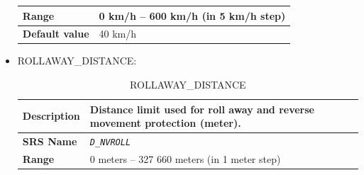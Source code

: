 \begin{itemize}
\begin{longtable}{|l|l|}
				\hline

					\begin{minipage}[t]{0.22\linewidth} \textbf{Range}	\end{minipage}
				&	\begin{minipage}[t]{0.78\linewidth} 0 km/h – 600 km/h (in 5 km/h step) \end{minipage} \\

				\hline

					\begin{minipage}[t]{0.22\linewidth} \textbf{Default value}	\end{minipage}
				&	\begin{minipage}[t]{0.78\linewidth} 40 km/h \end{minipage} \\

				\hline

			\end{longtable}

		\item ROLLAWAY\_DISTANCE:

			\begin{longtable}{|l|l|}
				\caption{ROLLAWAY\_DISTANCE}\\
				\hline

					\begin{minipage}[t]{0.22\linewidth} \textbf{Description}	\end{minipage}
				&	\begin{minipage}[t]{0.78\linewidth} Distance limit used for roll away and reverse movement protection (meter). \end{minipage} \\

				\hline

					\begin{minipage}[t]{0.22\linewidth} \textbf{SRS Name}	\end{minipage}
				&	\begin{minipage}[t]{0.78\linewidth} \emph{\texttt{D\_NVROLL}} \end{minipage} \\

				\hline

					\begin{minipage}[t]{0.22\linewidth} \textbf{Range}	\end{minipage}
				&	\begin{minipage}[t]{0.78\linewidth} 0 meters – 327 660 meters (in 1 meter step) \end{minipage} \\


\end{longtable}
\end{itemize}
